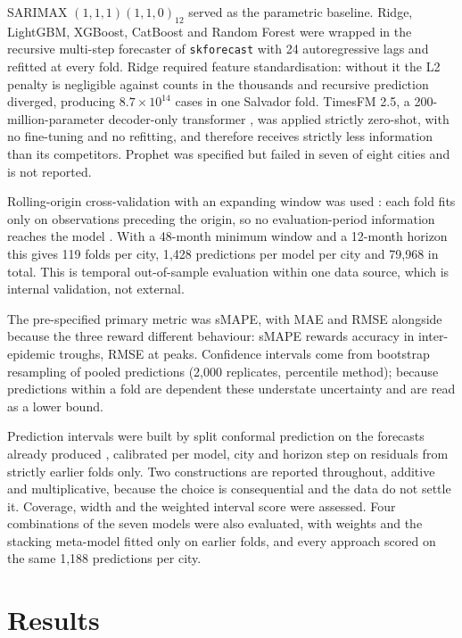\documentclass[11pt]{article}
\begin{document}
SARIMAX $(1,1,1)(1,1,0)_{12}$ served as the parametric baseline. Ridge, LightGBM,
XGBoost, CatBoost and Random Forest were wrapped in the recursive multi-step forecaster
of \texttt{skforecast} with 24 autoregressive lags and refitted at every fold. Ridge
required feature standardisation: without it the L2 penalty is negligible against counts
in the thousands and recursive prediction diverged, producing $8.7 \times 10^{14}$ cases
in one Salvador fold. TimesFM 2.5, a 200-million-parameter decoder-only transformer
\citep{Das2024timesfm}, was applied strictly zero-shot, with no fine-tuning and no
refitting, and therefore receives strictly less information than its competitors. Prophet
was specified but failed in seven of eight cities and is not reported.

Rolling-origin cross-validation with an expanding window was used
\citep{Tashman2000,Hewamalage2023}: each fold fits only on observations preceding the
origin, so no evaluation-period information reaches the model \citep{Kapoor2023}. With a
48-month minimum window and a 12-month horizon this gives 119 folds per city, 1{,}428
predictions per model per city and 79{,}968 in total. This is temporal out-of-sample
evaluation within one data source, which is internal validation, not external.

The pre-specified primary metric was sMAPE, with MAE and RMSE alongside because the three
reward different behaviour: sMAPE rewards accuracy in inter-epidemic troughs, RMSE at
peaks. Confidence intervals come from bootstrap resampling of pooled predictions (2{,}000
replicates, percentile method); because predictions within a fold are dependent these
understate uncertainty and are read as a lower bound.

Prediction intervals were built by split conformal prediction on the forecasts already
produced \citep{Angelopoulos2021conformal}, calibrated per model, city and horizon step
on residuals from strictly earlier folds only. Two constructions are reported throughout,
additive and multiplicative, because the choice is consequential and the data do not
settle it. Coverage, width and the weighted interval score \citep{Bracher2021wis} were
assessed. Four combinations of the seven models were also evaluated, with weights and the
stacking meta-model fitted only on earlier folds, and every approach scored on the same
1{,}188 predictions per city.

\section{Results}
\end{document}
